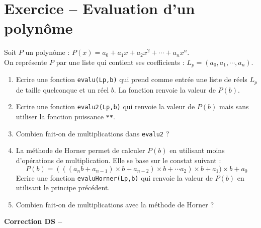 \section{Exercice -- Evaluation d'un polynôme}
Soit $P$ un polynôme : $P(x)=a_0+a_1x+a_2x^2+\cdots +a_nx^n$. \\
On représente $P$ par une liste qui contient ses coefficients : $L_p=(a_0,a_1,\cdots,a_n)$.
\begin{enumerate}
\item Ecrire une fonction \verb?evalu(Lp,b)? qui prend comme entrée une liste de réels $L_p$ de taille quelconque et un réel $b$. La fonction renvoie la valeur de $P(b)$.
\item Ecrire une fonction \verb?evalu2(Lp,b)? qui renvoie la valeur de $P(b)$ mais sans utiliser la fonction puissance \verb?**?.
\item Combien fait-on de multiplications dans \verb?evalu2? ?
\item La méthode de Horner permet de calculer $P(b)$ en utilisant moins d'opérations de multiplication. Elle se base sur le constat suivant :
\[P(b)=(((a_nb+a_{n-1})\times b+a_{n-2})\times b+\cdots a_2)\times b+a_1)\times b+a_0\] 
Ecrire une fonction \verb?evaluHorner(Lp,b)? qui renvoie la valeur de $P(b)$ en utilisant le principe précédent.
\item Combien fait-on de multiplications avec la méthode de Horner ?
\end{enumerate}





\ifdef{\public}{}{}

\newpage 


\begin{center}
{\Large\bf Correction DS \no {\num} -- \descrip}
\end{center}

\setcounter{section}{2}

